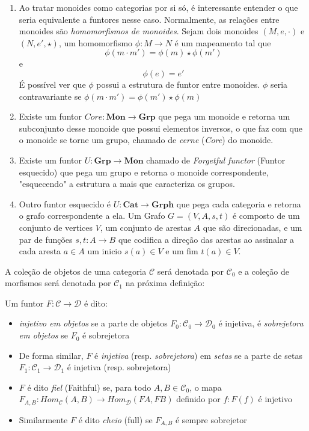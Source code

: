 \documentclass[../main.tex]{subfiles}
\begin{document}
\begin{enumerate}
    \item Ao tratar monoides como categorias por si só, é interessante entender o que seria equivalente a funtores nesse caso. Normalmente, as relações entre monoides são \emph{homomorfismos de monoides}. Sejam dois monoides $(M, e, \cdot)$ e $(N, e', \star)$, um homomorfismo $\phi : M \to N$ é um mapeamento tal que $$\phi(m \cdot m') = \phi(m) \star \phi(m')$$ e $$\phi(e) = e'$$
    É possível ver que $\phi$ possui a estrutura de funtor entre monoides. $\phi$ seria contravariante se $\phi(m \cdot m') = \phi(m') \star \phi(m)$
    \item Existe um funtor $Core : \textbf{Mon} \to \textbf{Grp}$ que pega um monoide e retorna um subconjunto desse monoide que possui elementos inversos, o que faz com que o monoide se torne um grupo, chamado de \emph{cerne} (\emph{Core}) do monoide.
    \item Existe um funtor $U : \textbf{Grp} \to \textbf{Mon}$ chamado de \emph{Forgetful functor} (Funtor esquecido) que pega um grupo e retorna o monoide correspondente, "esquecendo" a estrutura a mais que caracteriza os grupos.
    \item Outro funtor esquecido é $U : \textbf{Cat} \to \textbf{Grph}$ que pega cada categoria e retorna o grafo correspondente a ela. Um Grafo $G = (V, A, s, t)$ é composto de um conjunto de vertices $V$, um conjunto de arestas $A$ que são direcionadas, e um par de funções $s, t : A \to B$ que codifica a direção das arestas ao assinalar a cada aresta $a \in A$ um inicio $s(a) \in V$ e um fim $t(a) \in V$.
\end{enumerate}

A coleção de objetos de uma categoria $\mathcal{C}$ será denotada por $\mathcal{C}_0$ e a coleção de morfismos será denotada por $\mathcal{C}_1$ na próxima definição:

\begin{definition}
    Um funtor $F : \mathcal{C} \to \mathcal{D}$ é dito:
    \begin{itemize}
        \item \emph{injetivo em objetos} se a parte de objetos $F_0 : \mathcal{C}_0 \to \mathcal{D}_0$ é injetiva, é \emph{sobrejetora em objetos} se $F_0$ é sobrejetora
        \item De forma similar, $F$ é \emph{injetiva} (resp. \emph{sobrejetora}) em \emph{setas} se a parte de setas $F_1 : \mathcal{C}_1 \to \mathcal{D}_1$ é injetiva (resp. sobrejetora)
        \item $F$ é dito \emph{fiel} (Faithful) se, para todo $A, B \in \mathcal{C}_0$, o mapa $F_{A, B} : Hom_{\mathcal{C}}(A, B) \to Hom_{\mathcal{D}}(FA, FB)$ definido por $f : F(f)$ é injetivo
        \item Similarmente $F$ é dito \emph{cheio} (full) se $F_{A, B}$ é sempre sobrejetor
    \end{itemize}
\end{definition}
\end{document}

